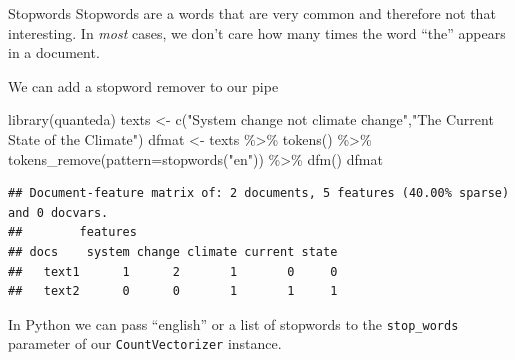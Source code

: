 \documentclass[
  10pt,
  ignorenonframetext,
  aspectratio=169]{beamer}
\newenvironment{Shaded}{\begin{snugshade}}{\end{snugshade}}
\newcommand{\AttributeTok}[1]{\textcolor[rgb]{0.80,0.80,0.80}{#1}}
\newcommand{\FunctionTok}[1]{\textcolor[rgb]{0.94,0.94,0.56}{#1}}
\newcommand{\NormalTok}[1]{\textcolor[rgb]{0.80,0.80,0.80}{#1}}
\newcommand{\OtherTok}[1]{\textcolor[rgb]{0.94,0.94,0.56}{#1}}
\newcommand{\SpecialCharTok}[1]{\textcolor[rgb]{0.86,0.64,0.64}{#1}}
\newcommand{\StringTok}[1]{\textcolor[rgb]{0.80,0.58,0.58}{#1}}
\begin{document}
\begin{frame}[fragile]{Stopwords}
\protect\hypertarget{stopwords}{}
Stopwords are a words that are very common and therefore not that
interesting. In \emph{most} cases, we don't care how many times the word
``the'' appears in a document.

We can add a stopword remover to our pipe

\scriptsize

\begin{Shaded}
\begin{Highlighting}[]
\FunctionTok{library}\NormalTok{(quanteda)}
\NormalTok{texts }\OtherTok{\textless{}{-}} \FunctionTok{c}\NormalTok{(}\StringTok{"System change not climate change"}\NormalTok{,}\StringTok{"The Current State of the Climate"}\NormalTok{)}
\NormalTok{dfmat }\OtherTok{\textless{}{-}}\NormalTok{ texts }\SpecialCharTok{\%\textgreater{}\%}
  \FunctionTok{tokens}\NormalTok{() }\SpecialCharTok{\%\textgreater{}\%}
  \FunctionTok{tokens\_remove}\NormalTok{(}\AttributeTok{pattern=}\FunctionTok{stopwords}\NormalTok{(}\StringTok{"en"}\NormalTok{)) }\SpecialCharTok{\%\textgreater{}\%} 
  \FunctionTok{dfm}\NormalTok{()}
\NormalTok{dfmat}
\end{Highlighting}
\end{Shaded}

\begin{verbatim}
## Document-feature matrix of: 2 documents, 5 features (40.00% sparse) and 0 docvars.
##        features
## docs    system change climate current state
##   text1      1      2       1       0     0
##   text2      0      0       1       1     1
\end{verbatim}

\normalsize

In Python we can pass ``english'' or a list of stopwords to the
\texttt{stop\_words} parameter of our \texttt{CountVectorizer} instance.
\end{frame}
\end{document}
